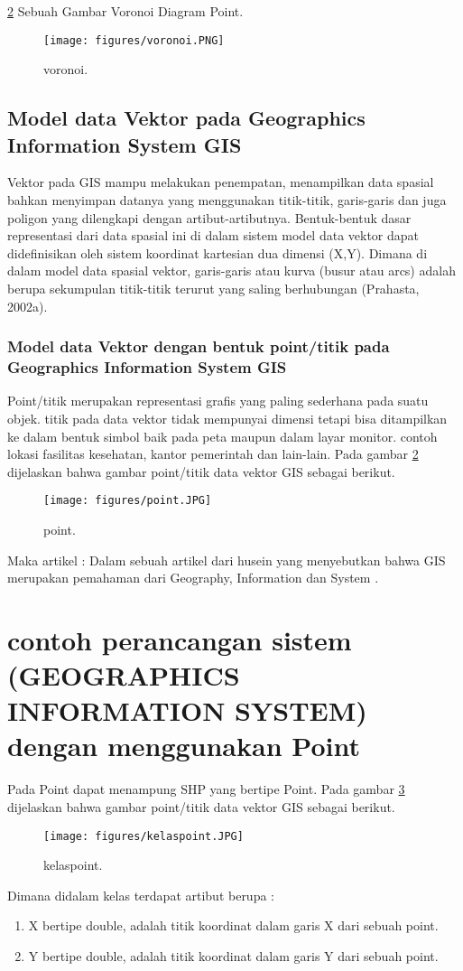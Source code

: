 \ref{point} Sebuah Gambar Voronoi Diagram Point.
\begin{figure}[ht]
	\centerline{\texttt{[image: figures/voronoi.PNG]}}
	\caption{voronoi.}
	\label{voronoi}
	\end{figure}

\subsection{Model data Vektor pada Geographics Information System GIS}
Vektor  pada GIS mampu melakukan penempatan, menampilkan data spasial bahkan menyimpan datanya yang menggunakan titik-titik, garis-garis dan juga poligon yang dilengkapi dengan artibut-artibutnya. Bentuk-bentuk dasar representasi dari data spasial ini di dalam sistem model data vektor dapat didefinisikan oleh sistem koordinat kartesian dua dimensi (X,Y). Dimana di dalam model data spasial vektor, garis-garis atau kurva (busur atau arcs) adalah berupa sekumpulan titik-titik terurut yang saling berhubungan (Prahasta, 2002a). 

\subsubsection{Model data Vektor dengan bentuk point/titik pada Geographics Information System GIS}
Point/titik merupakan representasi grafis yang paling sederhana pada suatu objek. titik pada data vektor tidak mempunyai dimensi tetapi bisa ditampilkan ke dalam bentuk simbol baik pada peta maupun dalam layar monitor. contoh  lokasi fasilitas kesehatan, kantor pemerintah dan lain-lain.
Pada gambar \ref{point} dijelaskan bahwa gambar point/titik data vektor GIS sebagai berikut.
\begin{figure}[ht]
	\centerline{\texttt{[image: figures/point.JPG]}}
	\caption{point.}
	\label{point}
	\end{figure}

Maka artikel :
	Dalam sebuah artikel dari husein yang menyebutkan bahwa  GIS merupakan pemahaman dari
	Geography, Information dan System \cite{widiatmoko2009aplikasi}.

\section{contoh perancangan sistem (GEOGRAPHICS INFORMATION SYSTEM) dengan menggunakan Point}
Pada Point dapat menampung SHP yang bertipe Point.
Pada gambar \ref{kelaspoint} dijelaskan bahwa gambar point/titik data vektor GIS sebagai berikut.
\begin{figure}[ht]
	\centerline{\texttt{[image: figures/kelaspoint.JPG]}}
	\caption{kelaspoint.}
	\label{kelaspoint}
	\end{figure}
Dimana didalam kelas terdapat artibut berupa :
\begin{enumerate}
\item X bertipe double, adalah titik koordinat dalam garis X dari sebuah point.
\item Y bertipe double, adalah titik koordinat dalam garis Y dari sebuah point.
\end{enumerate}

